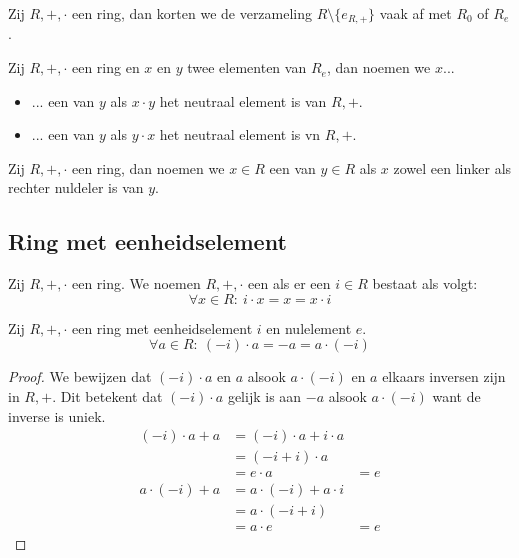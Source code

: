 \documentclass[main.tex]{subfiles}
\begin{document}
\begin{de}
  Zij $R,+,\cdot$ een ring, dan korten we de verzameling $R\setminus \{e_{R,+}\}$ vaak af met $R_{0}$ of $R_{e}$.
\end{de}

\begin{de}
  Zij $R,+,\cdot$ een ring en $x$ en $y$ twee elementen van $R_{e}$, dan noemen we $x$...
  \begin{itemize}
  \item ... een  van $y$ als $x\cdot y$ het neutraal element is van $R,+$.
  \item ... een  van $y$ als $y\cdot x$ het neutraal element is vn $R,+$.
  \end{itemize}
\end{de}

\begin{de}
  Zij $R,+,\cdot$ een ring, dan noemen we $x\in R$ een  van $y\in R$ als $x$ zowel een linker als rechter nuldeler is van $y$.
\end{de}

\subsection{Ring met eenheidselement}
\label{sec:ring-met-eenheidselement}

\begin{de}
  Zij $R,+,\cdot$ een ring.
  We noemen $R,+,\cdot$ een  als er een  $i\in R$ bestaat als volgt:
  \[ \forall x\in R:\ i\cdot x = x = x \cdot i \]
\end{de}

\begin{ei}
  Zij $R,+,\cdot$ een ring met eenheidselement $i$ en nulelement $e$.
  \[ \forall a \in R:\ (-i)\cdot a = -a = a \cdot (-i) \]

  \begin{proof}
    We bewijzen dat $(-i) \cdot a$ en $a$ alsook $a \cdot (-i)$ en $a$ elkaars inversen zijn in $R,+$.
    Dit betekent dat $(-i) \cdot a$ gelijk is aan $-a$ alsook $a\cdot (-i)$ want de inverse is uniek.
    \[
    \begin{array}{rll}
      (-i) \cdot a + a &= (-i) \cdot a + i \cdot a &\\
                       &= (-i + i) \cdot a &\\
                       &= e \cdot a &= e
    \end{array}
    \]
    \[
    \begin{array}{rll}
      a \cdot (-i) + a &= a \cdot (-i) + a \cdot i &\\
                       &= a \cdot (-i+i) &\\
                       &= a \cdot e &= e
    \end{array}
    \]
  \end{proof}
\end{ei}
\end{document}
